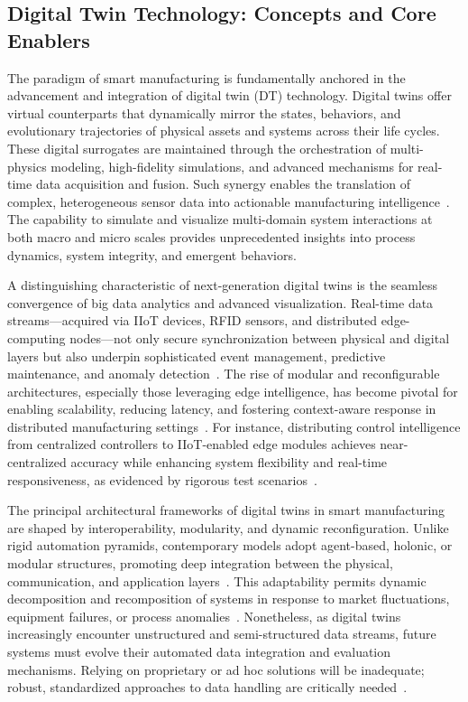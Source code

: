 \subsection{Digital Twin Technology: Concepts and Core Enablers}

The paradigm of smart manufacturing is fundamentally anchored in the advancement and integration of digital twin (DT) technology. Digital twins offer virtual counterparts that dynamically mirror the states, behaviors, and evolutionary trajectories of physical assets and systems across their life cycles. These digital surrogates are maintained through the orchestration of multi-physics modeling, high-fidelity simulations, and advanced mechanisms for real-time data acquisition and fusion. Such synergy enables the translation of complex, heterogeneous sensor data into actionable manufacturing intelligence~\cite{ref91}. The capability to simulate and visualize multi-domain system interactions at both macro and micro scales provides unprecedented insights into process dynamics, system integrity, and emergent behaviors.

A distinguishing characteristic of next-generation digital twins is the seamless convergence of big data analytics and advanced visualization. Real-time data streams---acquired via IIoT devices, RFID sensors, and distributed edge-computing nodes---not only secure synchronization between physical and digital layers but also underpin sophisticated event management, predictive maintenance, and anomaly detection~\cite{ref4,ref8,ref11,ref12,ref13,ref14,ref16,ref18,ref19,ref20,ref27,ref28,ref29,ref30,ref36,ref38,ref41,ref43,ref44,ref45,ref57,ref59,ref91}. The rise of modular and reconfigurable architectures, especially those leveraging edge intelligence, has become pivotal for enabling scalability, reducing latency, and fostering context-aware response in distributed manufacturing settings~\cite{ref91}. For instance, distributing control intelligence from centralized controllers to IIoT-enabled edge modules achieves near-centralized accuracy while enhancing system flexibility and real-time responsiveness, as evidenced by rigorous test scenarios~\cite{ref3}.

The principal architectural frameworks of digital twins in smart manufacturing are shaped by interoperability, modularity, and dynamic reconfiguration. Unlike rigid automation pyramids, contemporary models adopt agent-based, holonic, or modular structures, promoting deep integration between the physical, communication, and application layers~\cite{ref25}. This adaptability permits dynamic decomposition and recomposition of systems in response to market fluctuations, equipment failures, or process anomalies~\cite{ref3}. Nonetheless, as digital twins increasingly encounter unstructured and semi-structured data streams, future systems must evolve their automated data integration and evaluation mechanisms. Relying on proprietary or ad hoc solutions will be inadequate; robust, standardized approaches to data handling are critically needed~\cite{ref91}.

